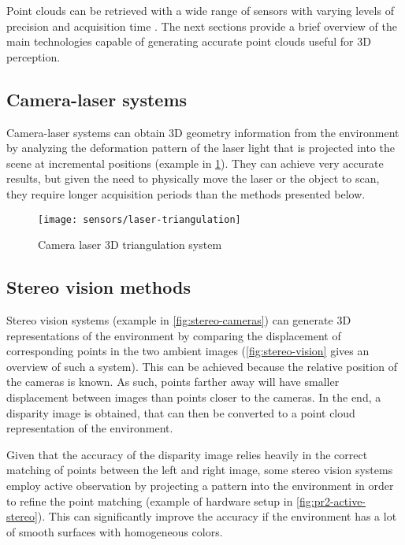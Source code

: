 Point clouds can be retrieved with a wide range of sensors with varying levels of precision and acquisition time \cite{Sansoni2009}. The next sections provide a brief overview of the main technologies capable of generating accurate point clouds useful for 3D perception.


\subsection{Camera-laser systems}

Camera-laser systems can obtain 3D geometry information from the environment by analyzing the deformation pattern of the laser light that is projected into the scene at incremental positions (example in \cref{fig:laser-triangulation}). They can achieve very accurate results, but given the need to physically move the laser or the object to scan, they require longer acquisition periods than the methods presented below.

\begin{figure}[H]
	\centering
	\texttt{[image: sensors/laser-triangulation]}
	\caption[Camera laser 3D triangulation system]{Camera laser 3D triangulation system\protect\footnotemark}
	\label{fig:laser-triangulation}
\end{figure}


\subsection{Stereo vision methods}

Stereo vision systems (example in \cref{fig:stereo-cameras}) can generate 3D representations of the environment by comparing the displacement of corresponding points in the two ambient images (\cref{fig:stereo-vision} gives an overview of such a system). This can be achieved because the relative position of the cameras is known. As such, points farther away will have smaller displacement between images than points closer to the cameras. In the end, a disparity image is obtained, that can then be converted to a point cloud representation of the environment.

Given that the accuracy of the disparity image relies heavily in the correct matching of points between the left and right image, some stereo vision systems employ active observation by projecting a pattern into the environment in order to refine the point matching (example of hardware setup in \cref{fig:pr2-active-stereo}). This can significantly improve the accuracy if the environment has a lot of smooth surfaces with homogeneous colors.

